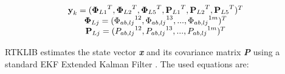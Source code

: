 \begin{equation} 
	\begin{matrix} 
		\textbf{y}_{k}= ({\boldsymbol{\Phi}_{L1}}^{T}, {\boldsymbol{\Phi}_{L2}}^{T},{\boldsymbol{\Phi}_{L5}}^{T}, {\textbf{P}_{L1}}^{T},{\textbf{P}_{L2}}^{T}, {\textbf{P}_{L5}}^{T})^{T}\\ 
		\boldsymbol{\Phi}_{Lj}= ({\Phi_{ab,lj}}^{12},{\Phi_{ab,lj}}^{13},...,{\Phi_{ab,lj}}^{1m})^{T}\\
        \textbf{P}_{Lj}= ({P_{ab,lj}}^{12},{P_{ab,lj}}^{13},...,{P_{ab,lj}}^{1m})^{T}\\
		\end{matrix}
	\\
	\label{eq:measvector_rtklib}
\end{equation}

RTKLIB estimates the state vector
\textbf{\textit{x}} and its covariance matrix \textbf{\textit{P}} using a standard EKF Extended Kalman Filter \cite{kalman:1960, grewal2001}. The used equations are:

